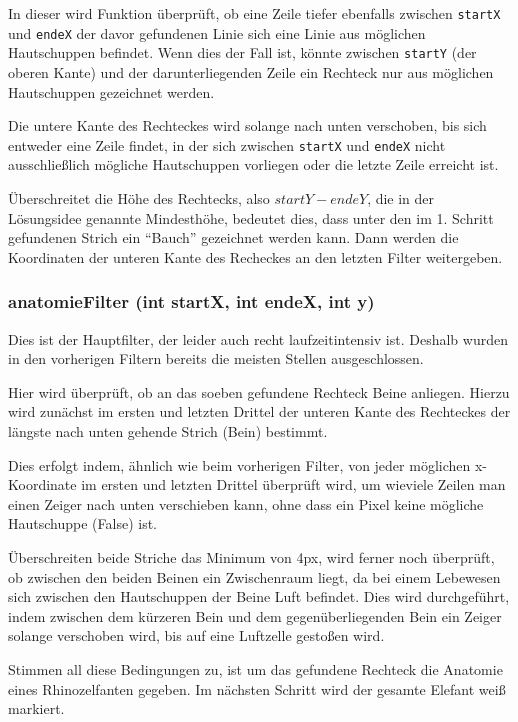 		In dieser wird Funktion überprüft, ob eine Zeile tiefer ebenfalls zwischen \texttt{startX} und \texttt{endeX} der davor gefundenen Linie sich eine Linie aus möglichen Hautschuppen befindet. Wenn dies der Fall ist, könnte zwischen \texttt{startY} (der oberen Kante) und der darunterliegenden Zeile ein Rechteck nur aus möglichen Hautschuppen gezeichnet werden. 

		Die untere Kante des Rechteckes wird solange nach unten verschoben, bis sich entweder eine Zeile findet, in der sich zwischen \texttt{startX} und \texttt{endeX} nicht ausschließlich mögliche Hautschuppen vorliegen oder die letzte Zeile erreicht ist.
		
		Überschreitet die Höhe des Rechtecks, also \(startY - endeY\), die in der Lösungsidee genannte Mindesthöhe, bedeutet dies, dass unter den im 1. Schritt gefundenen Strich ein "`Bauch"' gezeichnet werden kann. Dann werden die Koordinaten der unteren Kante des Recheckes an den letzten Filter weitergeben.

		\subsubsection{anatomieFilter (int startX, int endeX, int y)}
		Dies ist der Hauptfilter, der leider auch recht laufzeitintensiv ist. Deshalb wurden in den vorherigen Filtern bereits die meisten Stellen ausgeschlossen. 

		Hier wird überprüft, ob an das soeben gefundene Rechteck Beine anliegen. Hierzu wird zunächst im ersten und letzten Drittel der unteren Kante des Rechteckes der längste nach unten gehende Strich (Bein) bestimmt.

		Dies erfolgt indem, ähnlich wie beim vorherigen Filter, von jeder möglichen x-Koordinate im ersten und letzten Drittel überprüft wird, um wieviele Zeilen man einen Zeiger nach unten verschieben kann, ohne dass ein Pixel keine mögliche Hautschuppe (False) ist.
		
		Überschreiten beide Striche das Minimum von 4px, wird ferner noch überprüft, ob zwischen den beiden Beinen ein Zwischenraum liegt, da bei einem Lebewesen sich zwischen den Hautschuppen der Beine Luft befindet. Dies wird durchgeführt, indem zwischen dem kürzeren Bein und dem gegenüberliegenden Bein ein Zeiger solange verschoben wird, bis auf eine Luftzelle gestoßen wird.

		Stimmen all diese Bedingungen zu, ist um das gefundene Rechteck die Anatomie eines Rhinozelfanten gegeben. Im nächsten Schritt wird der gesamte Elefant weiß markiert.

